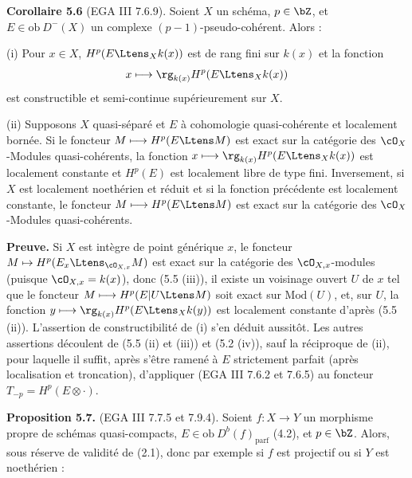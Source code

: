 \medskip

\noindent\textbf{Corollaire 5.6} (EGA III 7.6.9). Soient $X$ un sch\'{e}ma, $p \in \bZ$, et $E \in \mathrm{ob}\ D^-(X)$ un complexe $(p-1)$-pseudo-coh\'{e}rent. Alors :

\medskip

(i) Pour $x \in X$, $H^p(E \Ltens_X k(x))$ est de rang fini sur $k(x)$ et la fonction
\[
x \longmapsto \rg_{k(x)} H^p(E \Ltens_X k(x))
\]
est constructible et semi-continue sup\'{e}rieurement sur $X$.

\smallskip

(ii) Supposons $X$ quasi-s\'{e}par\'{e} et $E$ \`{a} cohomologie quasi-coh\'{e}rente et localement born\'{e}e. Si le foncteur $M \longmapsto H^p(E \Ltens M)$ est exact sur la cat\'{e}gorie des $\cO_X$-Modules quasi-coh\'{e}rents, la fonction $x \longmapsto \rg_{k(x)} H^p(E \Ltens_X k(x))$ est localement constante et $H^p(E)$ est localement libre de type fini. Inversement, si $X$ est localement noeth\'{e}rien et r\'{e}duit et si la fonction pr\'{e}c\'{e}dente est localement constante, le foncteur $M \longmapsto H^p(E \Ltens M)$ est exact sur la cat\'{e}gorie des $\cO_X$-Modules quasi-coh\'{e}rents.

\medskip

\noindent\textbf{Preuve.} Si $X$ est int\`{e}gre de point g\'{e}n\'{e}rique $x$, le foncteur $M \mapsto H^p(E_x \Ltens_{\cO_{X,x}} M)$ est exact sur la cat\'{e}gorie des $\cO_{X,x}$-modules (puisque $\cO_{X,x} = k(x)$), donc (5.5 (iii)), il existe un voisinage ouvert $U$ de $x$ tel que le foncteur $M \longmapsto H^p(E|U \Ltens M)$ soit exact sur $\mathrm{Mod}(U)$, et, sur $U$, la fonction $y \longmapsto \rg_{k(x)} H^p(E \Ltens_X k(y))$ est localement constante d'apr\`{e}s (5.5 (ii)). L'assertion de constructibilit\'{e} de (i) s'en d\'{e}duit aussit\^{o}t. Les autres assertions d\'{e}coulent de (5.5 (ii) et (iii)) et (5.2 (iv)), sauf la r\'{e}ciproque de (ii), pour laquelle il suffit, apr\`{e}s s'\^{e}tre ramen\'{e} \`{a} $E$ strictement parfait (apr\`{e}s localisation et troncation), d'appliquer (EGA III 7.6.2 et 7.6.5) au foncteur $T_{-p} = H^p(E \otimes \cdot)$.

\medskip

\noindent\textbf{Proposition 5.7.} (EGA III 7.7.5 et 7.9.4). Soient $f : X \longrightarrow Y$ un morphisme propre de sch\'{e}mas quasi-compacts, $E \in \mathrm{ob}\ D^b(f)_{\mathrm{parf}}$ (4.2), et $p \in \bZ$. Alors, sous r\'{e}serve de validit\'{e} de (2.1), donc par exemple si $f$ est projectif ou si $Y$ est noeth\'{e}rien :

